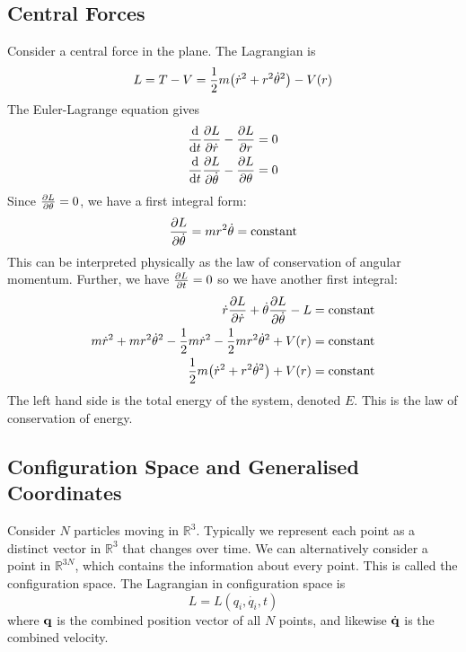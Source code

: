 \subsection{Central Forces}
\begin{example}
	Consider a central force in the plane.
	The Lagrangian is
	\[
		L = T - V = \frac{1}{2}m\qty(\dot r^2 + r^2 \dot \theta^2) - V(r)
	\]
	The Euler-Lagrange equation gives
	\begin{align*}
		\dv{t}\pdv{L}{\dot r} - \pdv{L}{r}           & = 0 \\
		\dv{t}\pdv{L}{\dot \theta} - \pdv{L}{\theta} & = 0
	\end{align*}
	Since \( \pdv{L}{\theta} = 0 \), we have a first integral form:
	\[
		\pdv{L}{\dot \theta} = mr^2 \dot \theta = \text{constant}
	\]
	This can be interpreted physically as the law of conservation of angular momentum.
	Further, we have \( \pdv{L}{t} = 0 \) so we have another first integral:
	\begin{align*}
		\dot r \pdv{L}{\dot r} + \dot\theta \pdv{L}{\dot\theta} - L                              & = \text{constant} \\
		m\dot r^2 + mr^2\dot\theta^2 - \frac{1}{2}m\dot r^2 - \frac{1}{2}mr^2\dot\theta^2 + V(r) & = \text{constant} \\
		\frac{1}{2} m \qty( \dot r^2 + r^2\dot\theta^2 ) + V(r)                                  & = \text{constant}
	\end{align*}
	The left hand side is the total energy of the system, denoted \( E \).
	This is the law of conservation of energy.
\end{example}

\subsection{Configuration Space and Generalised Coordinates}
\begin{example}
	Consider \( N \) particles moving in \( \mathbb R^3 \).
	Typically we represent each point as a distinct vector in \( \mathbb R^3 \) that changes over time.
	We can alternatively consider a point in \( \mathbb R^{3N} \), which contains the information about every point.
	This is called the configuration space.
	The Lagrangian in configuration space is
	\[
		L = L(q_i, \dot {q_i}, t)
	\]
	where \( \vb q \) is the combined position vector of all \( N \) points, and likewise \( \dot{\vb q} \) is the combined velocity.
\end{example}

